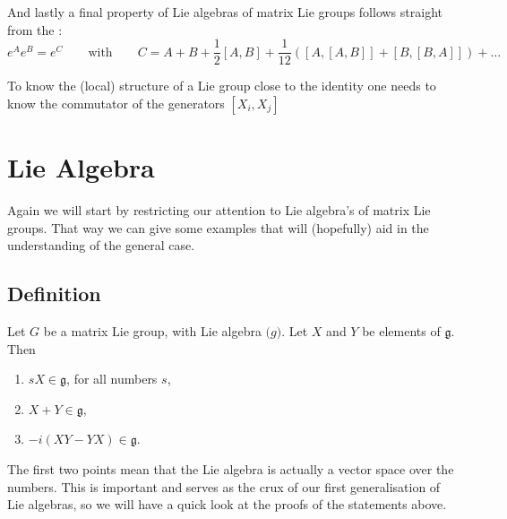 And lastly a final property of Lie algebras of matrix Lie groups follows straight from the : 
\[ e^{A}e^{B} = e^C \qquad \text{with} \qquad C=A+B+\frac{1}{2}[A,B] + \frac{1}{12}([A,[A,B]]+[B,[B,A]]) + \ldots  \]
\begin{eigenschap}
To know the (local) structure of a Lie group close to the identity one  needs to know the commutator of the generators $[X_i,X_j]$
\end{eigenschap}

\section{Lie Algebra}
Again we will start by restricting our attention to Lie algebra's of matrix Lie groups. That way we can give some examples that will (hopefully) aid in the understanding of the general case.


\subsection{Definition}

\begin{eigenschap}
Let $G$ be a matrix Lie group, with Lie algebra $\mathfrak(g)$. Let $X$ and $Y$ be elements of $\mathfrak{g}$. Then
\begin{enumerate}
\item $sX \in \mathfrak{g}$, for all  numbers $s$,
\item $X+Y \in \mathfrak{g}$,
\item $-i(XY - YX)\in \mathfrak{g}$.
\end{enumerate}
\end{eigenschap}
The first two points mean that the Lie algebra is actually a vector space over the  numbers. This is important and serves as the crux of our first generalisation of Lie algebras, so we will have a quick look at the proofs of the statements above. 

